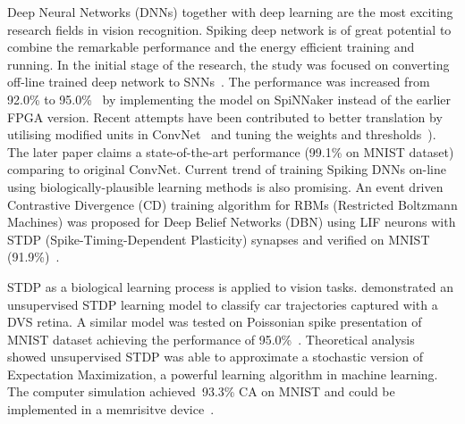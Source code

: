 Deep Neural Networks (DNNs) together with deep learning are the most exciting research fields in vision recognition.
Spiking deep network is of great potential to combine the remarkable performance and the energy efficient training and running.
In the initial stage of the research, the study was focused on converting off-line trained deep network to SNNs~\citep{o2013real}.
The performance was increased from 92.0\% to 95.0\%~\citep{Stromatias2015scalable} by implementing the model on SpiNNaker instead of the earlier FPGA version.
Recent attempts have been contributed to better translation by utilising modified units in ConvNet~\citep{cao2015spiking} and tuning the weights and thresholds~\citep{Diehl2015fast}).
The later paper claims a state-of-the-art performance (99.1\% on MNIST dataset) comparing to original ConvNet.
Current trend of training Spiking DNNs on-line using biologically-plausible learning methods is also promising.
An event driven Contrastive Divergence (CD) training algorithm for RBMs (Restricted Boltzmann Machines) was proposed for Deep Belief Networks (DBN) using LIF neurons with STDP (Spike-Timing-Dependent Plasticity) synapses and verified on MNIST (91.9\%)~\citep{neftci2013event}.

STDP as a biological learning process is applied to vision tasks.
\cite{bichler2012extraction} demonstrated an unsupervised STDP learning model to classify car trajectories captured with a DVS retina. 
A similar model was tested on Poissonian spike presentation of MNIST dataset achieving the performance of 95.0\%~\citep{diehl2015unsupervised}.
Theoretical analysis~\citep{nessler2013bayesian} showed unsupervised STDP was able to approximate a stochastic version of Expectation Maximization, a powerful learning algorithm in machine learning.
The computer simulation achieved~93.3\% CA on MNIST and could be implemented in a memrisitve device~\citep{bill2014compound}. 

